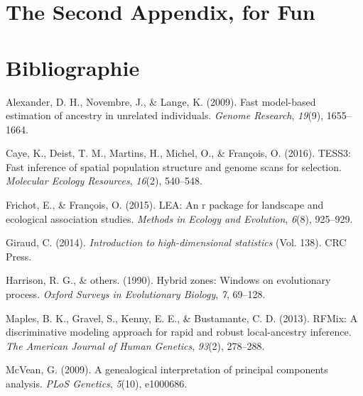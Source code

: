 \documentclass[12pt,twoside]{reedthesis}
\theoremstyle{definition}
\theoremstyle{definition}
\theoremstyle{remark}
\begin{document}
  \chapter{The Second Appendix, for
  Fun}\label{the-second-appendix-for-fun}
  
  \backmatter
  
  \chapter*{Bibliographie}\label{bibliographie}
  
  \noindent
  
  \setlength{\parindent}{-0.20in} \setlength{\leftskip}{0.20in}
  \setlength{\parskip}{8pt}
  
  \hypertarget{refs}{}
  \hypertarget{ref-alexander2009fast}{}
  Alexander, D. H., Novembre, J., \& Lange, K. (2009). Fast model-based
  estimation of ancestry in unrelated individuals. \emph{Genome Research},
  \emph{19}(9), 1655--1664.
  
  \hypertarget{ref-caye2016tess3}{}
  Caye, K., Deist, T. M., Martins, H., Michel, O., \& François, O. (2016).
  TESS3: Fast inference of spatial population structure and genome scans
  for selection. \emph{Molecular Ecology Resources}, \emph{16}(2),
  540--548.
  
  \hypertarget{ref-frichot2015lea}{}
  Frichot, E., \& François, O. (2015). LEA: An r package for landscape and
  ecological association studies. \emph{Methods in Ecology and Evolution},
  \emph{6}(8), 925--929.
  
  \hypertarget{ref-giraud2014introduction}{}
  Giraud, C. (2014). \emph{Introduction to high-dimensional statistics}
  (Vol. 138). CRC Press.
  
  \hypertarget{ref-harrison1990hybrid}{}
  Harrison, R. G., \& others. (1990). Hybrid zones: Windows on
  evolutionary process. \emph{Oxford Surveys in Evolutionary Biology},
  \emph{7}, 69--128.
  
  \hypertarget{ref-maples2013rfmix}{}
  Maples, B. K., Gravel, S., Kenny, E. E., \& Bustamante, C. D. (2013).
  RFMix: A discriminative modeling approach for rapid and robust
  local-ancestry inference. \emph{The American Journal of Human Genetics},
  \emph{93}(2), 278--288.
  
  \hypertarget{ref-mcvean2009genealogical}{}
  McVean, G. (2009). A genealogical interpretation of principal components
  analysis. \emph{PLoS Genetics}, \emph{5}(10), e1000686.
  
\end{document}
